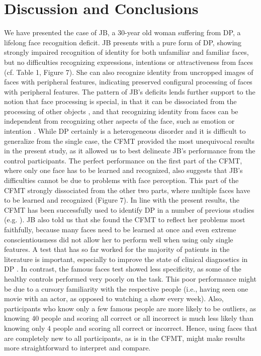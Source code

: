 \documentclass[fleqn,10pt]{SelfArx} %
\begin{document}
\section{Discussion and Conclusions}

We have presented the case of JB, a 30-year old woman suffering from DP, a lifelong face recognition deficit. JB presents with a pure form of DP, showing strongly impaired recognition of identity for both unfamiliar and familiar faces, but no difficulties recognizing expressions, intentions or attractiveness from faces (cf. Table 1, Figure 7). She can also recognize identity from uncropped images of faces with peripheral features, indicating preserved configural processing of faces with peripheral features.
The pattern of JB's deficits lends further support to the notion that face processing is special, in that it can be dissociated from the processing of other objects \citep{McKone_2011}, and that recognizing identity from faces can be independent from recognizing other aspects of the face, such as emotion or intention \citep{Haxby_2000, Calder_2005}.
While DP certainly is a heterogeneous disorder \citep{Duchaine_2006curr, Le_Grand_2006} and it is difficult to generalize from the single case, the CFMT provided the most unequivocal results in the present study, as it allowed us to best delineate JB's performance from the control participants. The perfect performance on the first part of the CFMT, where only one face has to be learned and recognized, also suggests that JB’s difficulties cannot be due to problems with face perception. This part of the CFMT strongly dissociated from the other two parts, where multiple faces have to be learned and recognized (Figure 7). In line with the present results, the CFMT has been successfully used to identify DP in a number of previous studies (e.g. \citet{Duchaine_2006cfmt, Duchaine_2006cog}). JB also told us that she found the CFMT to reflect her problems most faithfully, because many faces need to be learned at once and even extreme conscientiousness did not allow her to perform well when using only single features. A test that has so far worked for the majority of patients in the literature is important, especially to improve the state of clinical diagnostics in DP \citep{Shah_2016, Bate_2017}.
In contrast, the famous faces test showed less specificity, as some of the healthy controls performed very poorly on the task. This poor performance might be due to a cursory familiarity with the respective people (i.e., having seen one movie with an actor, as opposed to watching a show every week). Also, participants who know only a few famous people are more likely to be outliers, as knowing 40 people and scoring all correct or all incorrect is much less likely than knowing only 4 people and scoring all correct or incorrect. Hence, using faces that are completely new to all participants, as is in the CFMT, might make results more straightforward to interpret and compare.
\end{document}
